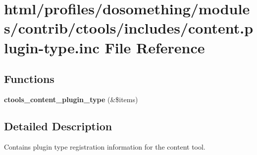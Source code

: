 \hypertarget{content_8plugin-type_8inc}{
\section{html/profiles/dosomething/modules/contrib/ctools/includes/content.plugin-\/type.inc File Reference}
\label{content_8plugin-type_8inc}
}
\subsection*{Functions}
\begin{DoxyCompactItemize}
\item 
\hypertarget{content_8plugin-type_8inc_a1287c4036467f2a23fce2c711e2ebced}{
{\bfseries ctools\_\-content\_\-plugin\_\-type} (\&\$items)}
\label{content_8plugin-type_8inc_a1287c4036467f2a23fce2c711e2ebced}

\end{DoxyCompactItemize}


\subsection{Detailed Description}
Contains plugin type registration information for the content tool. 